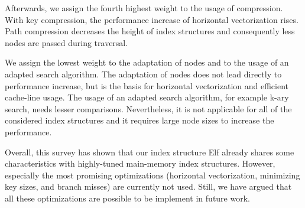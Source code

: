 \documentclass[runningheads,a4paper]{llncs}
\begin{document}
Afterwards, we assign the fourth highest weight to the usage of compression. With key compression, the performance increase of horizontal vectorization rises. Path compression decreases the height of index structures and consequently less nodes are passed during traversal. 

We assign the lowest weight to the adaptation of nodes and to the usage of an adapted search algorithm. The adaptation of nodes does not lead directly to performance increase, but is the basis for horizontal vectorization and efficient cache-line usage. The usage of an adapted search algorithm, for example k-ary search, needs lesser comparisons. Nevertheless, it is not applicable for all of the considered index structures and it requires large node sizes to increase the performance.  

Overall, this survey has shown that our index structure Elf already shares some characteristics with highly-tuned main-memory index structures. However, especially the most promising optimizations (horizontal vectorization, minimizing key sizes, and branch misses) are currently not used. Still, we have argued that all these optimizations are possible to be implement in future work.

\end{document}
